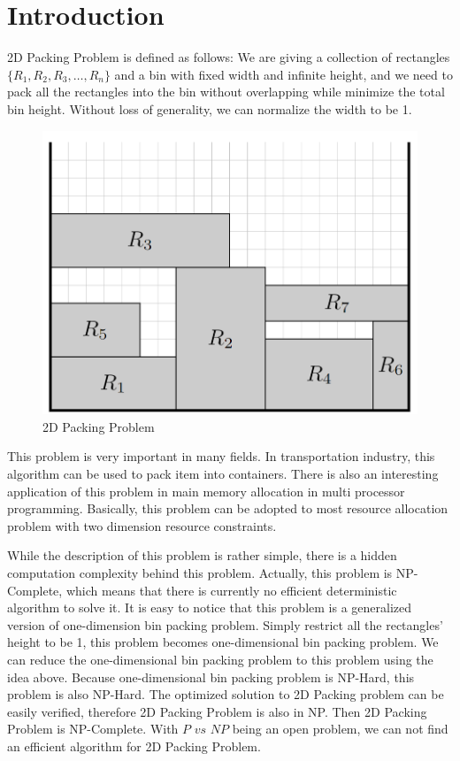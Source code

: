 \documentclass[sigplan,screen,nonacm]{acmart}\settopmatter{printfolios=true,printccs=false,printacmref=false}
\begin{document}
\section{Introduction}
2D Packing Problem is defined as follows: We are giving a collection of rectangles $\{R_1,R_2,R_3,\dots,R_n\}$ and a bin with fixed width and infinite height, and we need to pack all the rectangles into the bin without overlapping while minimize the total bin height\cite{baker1980orthogonal}. Without loss of generality, we can normalize the width to be 1.\par
\begin{figure}[htbp]
  \centering
  \includegraphics[scale=0.5]{2dpacking}
  \caption{2D Packing Problem}
  \label{fig:2dpacking}
\end{figure}
This problem is very important in many fields. In transportation industry, this algorithm can be used to pack item into containers. There is also an interesting application of this problem in main memory allocation in multi processor programming. Basically, this problem can be adopted to most resource allocation problem with two dimension resource constraints.\par
While the description of this problem is rather simple, there is a hidden computation complexity behind this problem. Actually, this problem is NP-Complete\cite{hartmanis1982computers}, which means that there is currently no efficient deterministic algorithm to solve it. It is easy to notice that this problem is a generalized version of one-dimension bin packing problem\cite{johnson1974worst}. Simply restrict all the rectangles' height to be 1, this problem becomes one-dimensional bin packing problem. We can reduce the one-dimensional bin packing problem to this problem using the idea above. Because one-dimensional bin packing problem is NP-Hard, this problem is also NP-Hard. The optimized solution to 2D Packing problem can be easily verified, therefore 2D Packing Problem is also in NP. Then 2D Packing Problem is NP-Complete. With $P$ $vs$ $NP$ being an open problem, we can not find an efficient algorithm for 2D Packing Problem. \par
\end{document}
